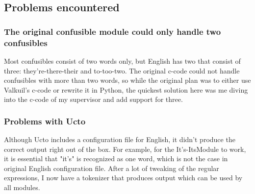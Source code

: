 \documentclass[12pt]{article}
\begin{document}
\subsection{Problems encountered}

\subsubsection{The original confusible module could only handle two confusibles}
Most confusibles consist of two words only, but English has two that consist of three: they're-there-their and to-too-two. The original c-code could not handle confusibles with more than two words, so while the original plan was to either use Valkuil's c-code or rewrite it in Python, the quickest solution here was me diving into the c-code of my supervisor and add support for three.

\subsubsection{Problems with Ucto}
Although Ucto includes a configuration file for English, it didn't produce the correct output right out of the box. For example, for the It's-ItsModule to work, it is essential that "it's" is recognized as one word, which is not the case in original English configuration file. After a lot of tweaking of the regular expressions, I now have a tokenizer that produces output which can be used by all modules.

\end{document}
